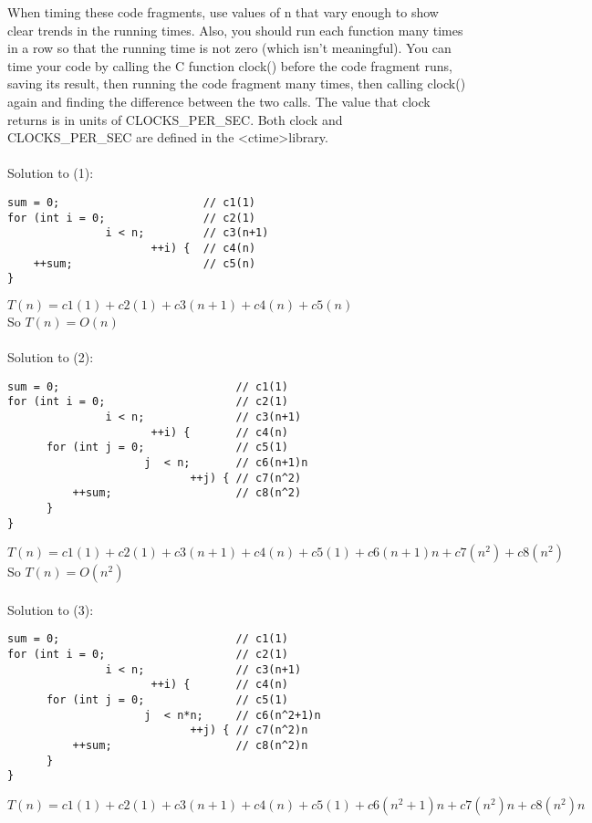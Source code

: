 \documentclass[12pt]{article}
\begin{document}
\begin{enumerate}
When timing these code fragments, use values of n that vary enough to show clear trends in the running times. 
Also, you should run each function many times in a row so that the running time is not zero (which isn't meaningful). 
You can time your code by calling the C function clock() before the code fragment runs, saving its result, then 
running the code fragment many times, then calling clock() again and finding the difference between the two calls. 
The value that clock\( \) returns is in units of CLOCKS\_PER\_SEC. Both clock\( \) and CLOCKS\_PER\_SEC are defined in the \textless ctime\textgreater  library. 
\\\\Solution to (1):
\\\begin{verbatim}
sum = 0;                      // c1(1)
for (int i = 0;               // c2(1)
               i < n;         // c3(n+1)
                      ++i) {  // c4(n)
    ++sum;                    // c5(n)
}
\end{verbatim}
$T(n) = c1(1)+c2(1)+c3(n+1)+c4(n)+c5(n)$
\\So $T(n) = O(n)$
\\\\Solution to (2):
\\\begin{verbatim}
sum = 0;                           // c1(1)
for (int i = 0;                    // c2(1)
               i < n;              // c3(n+1)
                      ++i) {       // c4(n)
      for (int j = 0;              // c5(1)
                     j  < n;       // c6(n+1)n
                            ++j) { // c7(n^2)
          ++sum;                   // c8(n^2)
      }                  
}
\end{verbatim}
$T(n) = c1(1)+c2(1)+c3(n+1)+c4(n)+c5(1) +c6(n+1)n+c7(n^2)+c8(n^2)$
\\So $T(n) = O(n^2)$
\\\\Solution to (3):
\\\begin{verbatim}
sum = 0;                           // c1(1)
for (int i = 0;                    // c2(1)
               i < n;              // c3(n+1)
                      ++i) {       // c4(n)
      for (int j = 0;              // c5(1)
                     j  < n*n;     // c6(n^2+1)n
                            ++j) { // c7(n^2)n
          ++sum;                   // c8(n^2)n
      }                  
}
\end{verbatim}
$T(n) = c1(1)+c2(1)+c3(n+1)+c4(n)+c5(1) +c6(n^2+1)n+c7(n^2)n+c8(n^2)n$

\end{enumerate}
\end{document}
